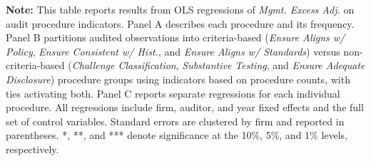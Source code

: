 \documentclass[12pt,fleqn]{article}
\begin{document}
\clearpage
\begin{landscape}
\begin{table}[!htbp]
    \addtocounter{table}{-1}
    \begin{threeparttable}[b]
        \captionsetup{labelfont = bf, singlelinecheck = off, justification = raggedright, labelsep = none}
        \caption{\\Specific Audit Procedures (continued)}

        \footnotesize
        \begin{flushleft}
           {\raggedright
           
           \par}
        \end{flushleft}
        \vspace{-6mm}

        \begin{tablenotes}
            \scriptsize
            \vspace{3mm}
            \item \textbf{Note:} This table reports results from OLS regressions of \textit{Mgmt. Excess Adj.} on audit procedure indicators. Panel A describes each procedure and its frequency. Panel B partitions audited observations into criteria-based (\textit{Ensure Aligns w/ Policy}, \textit{Ensure Consistent w/ Hist.}, and \textit{Ensure Aligns w/ Standards}) versus non-criteria-based (\textit{Challenge Classification}, \textit{Substantive Testing}, and \textit{Ensure Adequate Disclosure}) procedure groups using indicators based on procedure counts, with ties activating both. Panel C reports separate regressions for each individual procedure. All regressions include firm, auditor, and year fixed effects and the full set of control variables. Standard errors are clustered by firm and reported in parentheses. *, **, and *** denote significance at the 10\%, 5\%, and 1\% levels, respectively.
        \end{tablenotes}

    \end{threeparttable}
\end{table}
\end{landscape}
\end{document}
